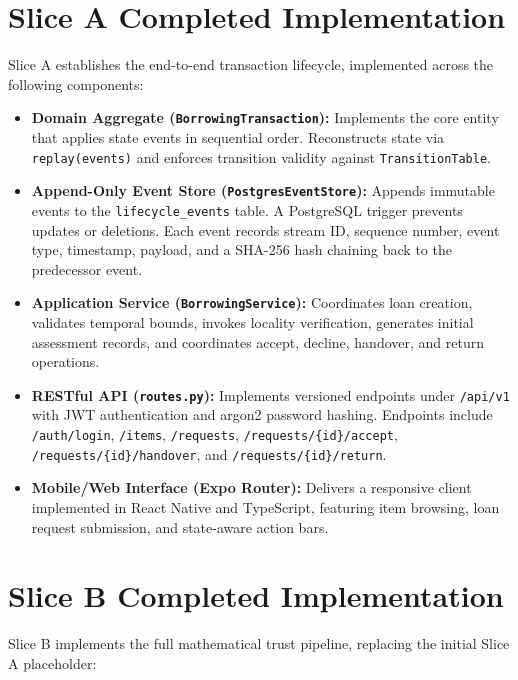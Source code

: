 \section{Slice A Completed Implementation}
Slice A establishes the end-to-end transaction lifecycle, implemented across the following components:
\begin{itemize}
    \item \textbf{Domain Aggregate (\texttt{BorrowingTransaction}):} Implements the core entity that applies state events in sequential order. Reconstructs state via \texttt{replay(events)} and enforces transition validity against \texttt{TransitionTable}.
    \item \textbf{Append-Only Event Store (\texttt{PostgresEventStore}):} Appends immutable events to the \texttt{lifecycle\_events} table. A PostgreSQL trigger prevents updates or deletions. Each event records stream ID, sequence number, event type, timestamp, payload, and a SHA-256 hash chaining back to the predecessor event.
    \item \textbf{Application Service (\texttt{BorrowingService}):} Coordinates loan creation, validates temporal bounds, invokes locality verification, generates initial assessment records, and coordinates accept, decline, handover, and return operations.
    \item \textbf{RESTful API (\texttt{routes.py}):} Implements versioned endpoints under \texttt{/api/v1} with JWT authentication and argon2 password hashing. Endpoints include \texttt{/auth/login}, \texttt{/items}, \texttt{/requests}, \texttt{/requests/\{id\}/accept}, \texttt{/requests/\{id\}/handover}, and \texttt{/requests/\{id\}/return}.
    \item \textbf{Mobile/Web Interface (Expo Router):} Delivers a responsive client implemented in React Native and TypeScript, featuring item browsing, loan request submission, and state-aware action bars.
\end{itemize}

\section{Slice B Completed Implementation}
Slice B implements the full mathematical trust pipeline, replacing the initial Slice A placeholder:


